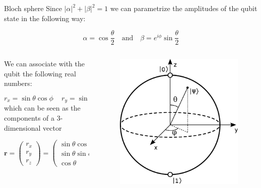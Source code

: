 \documentclass[11p,aspectratio=169]{beamer}
\begin{document}
\begin{frame}{Bloch sphere}
    Since $|\alpha|^2 + |\beta|^2 = 1$ we can parametrize the amplitudes
    of the qubit state in the following way:

    $$ \alpha = \cos \frac{\theta}{2} \quad \text{and} \quad \beta = e^{i \phi} \sin \frac{\theta}{2}$$ 
    
    \begin{columns}
        \begin{column}{0.5 \textwidth}
            \vspace{1cm}

            We can associate with the qubit the following real numbers:

    $$ r_x = \sin \theta \cos \phi \, \quad r_y = \sin \theta \sin \phi \, \quad r_z = \cos \theta  $$
    which can be seen as the components of a 3-dimensional vector

    $$ \textbf{r} = 
    \begin{pmatrix}
        r_x \\ r_y \\ r_z
    \end{pmatrix} = 
    \begin{pmatrix}
        \sin \theta \cos \phi \\
        \sin \theta \sin \phi \\
        \cos \theta
    \end{pmatrix} 
    $$
        \end{column}

    \begin{column}{0.4 \textwidth}
        \begin{figure}
            \includegraphics[width = \textwidth]{figures/Bloch_sphere.png}
        \end{figure}
        

\end{column}
\end{columns}
\end{frame}
\end{document}
